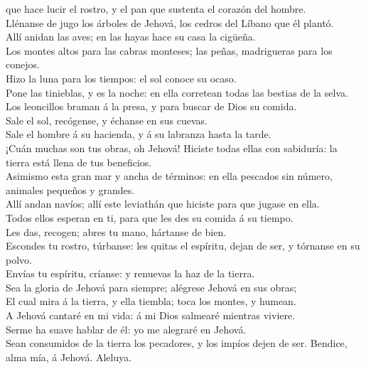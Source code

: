 que hace lucir el rostro, y el pan que sustenta el corazón del hombre.\\
 Llénanse de jugo los árboles de Jehová, los cedros del
Líbano que él plantó.\\
 Allí anidan las aves; en las hayas hace su casa la
cigüeña.\\
 Los montes altos para las cabras monteses; las peñas,
madrigueras para los conejos.\\
 Hizo la luna para los tiempos: el sol conoce su ocaso.\\
 Pone las tinieblas, y es la noche: en ella corretean todas
las bestias de la selva.\\
 Los leoncillos braman á la presa, y para buscar de Dios su
comida.\\
 Sale el sol, recógense, y échanse en sus cuevas.\\
 Sale el hombre á su hacienda, y á su labranza hasta la
tarde.\\
 ¡Cuán muchas son tus obras, oh Jehová! Hiciste todas ellas
con sabiduría: la tierra está llena de tus beneficios.\\
 Asimismo esta gran mar y ancha de términos: en ella
pescados sin número, animales pequeños y grandes.\\
 Allí andan navíos; allí este leviathán que hiciste para
que jugase en ella.\\
 Todos ellos esperan en ti, para que les des su comida á su
tiempo.\\
 Les das, recogen; abres tu mano, hártanse de bien.\\
 Escondes tu rostro, túrbanse: les quitas el espíritu,
dejan de ser, y tórnanse en su polvo.\\
 Envías tu espíritu, críanse: y renuevas la haz de la
tierra.\\
 Sea la gloria de Jehová para siempre; alégrese Jehová en
sus obras;\\
 El cual mira á la tierra, y ella tiembla; toca los montes,
y humean.\\
 A Jehová cantaré en mi vida: á mi Dios salmearé mientras
viviere.\\
 Serme ha suave hablar de él: yo me alegraré en Jehová.\\
 Sean consumidos de la tierra los pecadores, y los impíos
dejen de ser. Bendice, alma mía, á Jehová. Aleluya.

